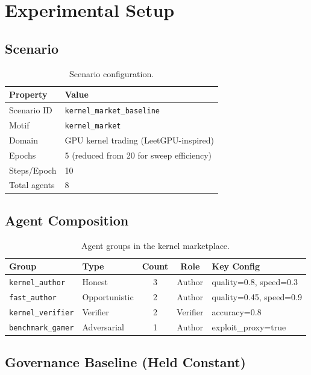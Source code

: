 \documentclass[11pt]{article}
\begin{document}
\section{Experimental Setup}

\subsection{Scenario}

\begin{table}[H]
\centering
\caption{Scenario configuration.}
\small
\begin{tabular}{@{}ll@{}}
\toprule
Property & Value \\
\midrule
Scenario ID & \texttt{kernel\_market\_baseline} \\
Motif & \texttt{kernel\_market} \\
Domain & GPU kernel trading (LeetGPU-inspired) \\
Epochs & 5 (reduced from 20 for sweep efficiency) \\
Steps/Epoch & 10 \\
Total agents & 8 \\
\bottomrule
\end{tabular}
\end{table}

\subsection{Agent Composition}

\begin{table}[H]
\centering
\caption{Agent groups in the kernel marketplace.}
\small
\begin{tabular}{@{}llccl@{}}
\toprule
Group & Type & Count & Role & Key Config \\
\midrule
\texttt{kernel\_author} & Honest & 3 & Author & quality=0.8, speed=0.3 \\
\texttt{fast\_author} & Opportunistic & 2 & Author & quality=0.45, speed=0.9 \\
\texttt{kernel\_verifier} & Verifier & 2 & Verifier & accuracy=0.8 \\
\texttt{benchmark\_gamer} & Adversarial & 1 & Author & exploit\_proxy=true \\
\bottomrule
\end{tabular}
\end{table}

\subsection{Governance Baseline (Held Constant)}
\end{document}
